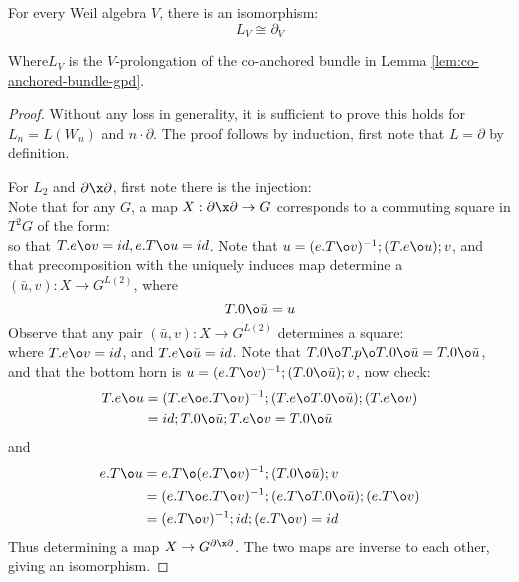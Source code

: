 \begin{proposition}
	For every Weil algebra $V$, there is an isomorphism:
	\[
		L_V \cong \partial_V
	\]

	Where$L_V$ is the $V$-prolongation of the co-anchored bundle in Lemma \ref{lem:co-anchored-bundle-gpd}.
\end{proposition}

\begin{proof}
	Without any loss in generality, it is sufficient to prove this holds for $L_{n} = L(W_n)$ and $n\cdot \partial$. The proof follows by induction, first note that $L = \partial$ by definition.

	For $L_2$ and $\partial \x \partial$, first note there is the injection:
	\[\]
	Note that for any $G$, a map $X: \partial \x \partial \to G$ corresponds to a commuting square in $T^2G$ of the form:
	\[\]
	so that $T.e \o v = id, e.T \o u = id$.
	Note that $u = (e.T \o v)^{-1};(T.e \o u);v$, and that precomposition with the uniquely induces map determine a $(\bar{u},v):X \to G^{L(2)}$, where
	\[ T.0 \o \bar{u} = u\]
	Observe that any pair $(\bar{u}, v):X \to  G^{L(2)}$ determines a square:
	\[
		
	\]
	where $T.e \o v = id$, and $T.e \o \bar{u} = id$.
	Note that $T.0 \o T.p \o T.0 \o \bar{u} = T.0 \o \bar{u}$, and that the bottom horn is $u = (e.T \o v)^{-1};(T.0 \o \bar{u});v$, now check:
	\begin{align*}
		T.e \o u
		 & = (T.e \o e.T \o v)^{-1};(T.e \o T.0 \o \bar{u});(T.e \o v) \\
		 & = id; T.0 \o \bar{u}; T.e \o v = T.0 \o \bar{u}
	\end{align*}
	and
	\begin{align*}
		e.T \o u
		 & = e.T \o (e.T \o v)^{-1};(T.0 \o \bar{u});v                 \\
		 & = (e.T \o e.T \o v)^{-1};(e.T \o T.0 \o \bar{u});(e.T \o v) \\
		 & = (e.T \o v)^{-1};id;(e.T \o v) = id
	\end{align*}
	Thus determining a map $X \to G^{\partial \x \partial}$.
	The two maps are inverse to each other, giving an isomorphism.



\end{proof}
